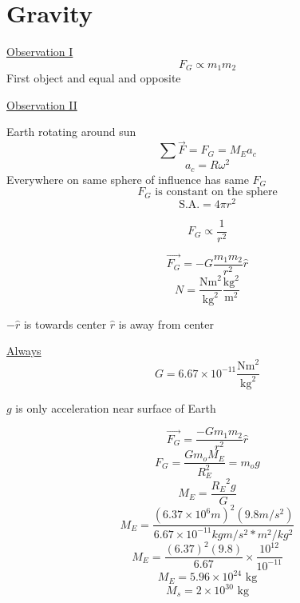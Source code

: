\documentclass[fleqn]{article}
\begin{document}
\setlength{\mathindent}{0pt}
\section*{Gravity}
\underline{Observation I}
\[ F_G \propto m_1 m_2\]
First object and equal and opposite

\bigbreak
\underline{Observation II}

Earth rotating around sun
\[ \sum \vec{F} = F_G = M_Ea_c \]
\[ a_c = R \omega ^2 \]
Everywhere on same sphere of influence has same $F_G$
\[ F_G \text{ is constant on the sphere}  \]
\[ \text{S.A.} = 4 \pi r^2 \]

\[ F_G \propto \frac{1}{r^2}  \]

\[ \vec{F_G}=-G
	\frac{m_1m_2}{r^2} \hat{r} \]
\[ N=\frac{\text{Nm}^2}{\text{kg}^2}\frac{\text{kg}^2}{\text{m}^2}   \]

$- \hat{r}$ is towards center $\hat{r}$ is away from center

\underline{Always}
\[ G = 6.67 \times 10^{-11} \frac{\text{Nm}^2}{\text{kg}^2}  \]

$g$ is only acceleration near surface of Earth

\[ \vec{F_G} = \frac{-Gm_1m_2}{r^2} \hat{r} \]
\[ F_G=\frac{Gm_oM_E}{R_E ^2} = m_og \]
\[ M_E = \frac{{R_E}^2 g}{G} \]
\[ M_E = \frac{(6.37 \times 10^6 m)^2(9.8 m/s^2)}{6.67 \times 10^{-11} kgm/s^2*m^2/kg^2} \]
\[ M_E = \frac{(6.37)^2 (9.8)}{6.67} \times \frac{10^{12}}{10^{-11}}   \]
\[ M_E = 5.96 \times 10^{24} \text{ kg}  \]
\[ M_s = 2 \times 10^{30} \text{ kg}  \]
\end{document}
